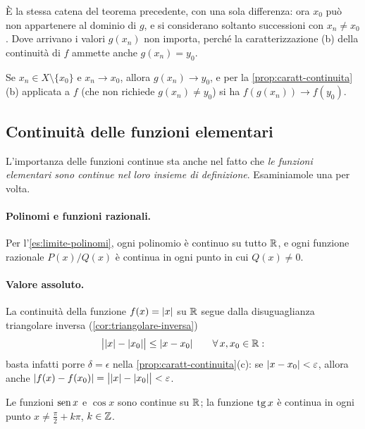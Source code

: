 \begin{strategia}
È la stessa catena del teorema precedente, con una sola differenza: ora $x_{0}$ può
non appartenere al dominio di $g$, e si considerano soltanto successioni con
$x_{n}\neq x_{0}$. Dove arrivano i valori $g(x_{n})$ non importa, perché la
caratterizzazione (b) della continuità di $f$ ammette anche $g(x_{n})=y_{0}$.
\end{strategia}

\begin{dimostrazione}
Se $x_{n}\in X\setminus\{x_{0}\}$ e $x_{n}\to x_{0}$, allora $g(x_{n})\to y_{0}$, e per
la \cref{prop:caratt-continuita}(b) applicata a $f$ (che non richiede $g(x_{n})\neq
y_{0}$) si ha $f(g(x_{n}))\to f(y_{0})$.
\end{dimostrazione}

\subsection{Continuità delle funzioni elementari}

L'importanza delle funzioni continue sta anche nel fatto che \emph{le funzioni
elementari sono continue nel loro insieme di definizione}. Esaminiamole una per volta.

\paragraph{Polinomi e funzioni razionali.} Per l'\cref{es:limite-polinomi}, ogni polinomio
è continuo su tutto $\mathbb{R}$, e ogni funzione razionale $P(x)/Q(x)$ è continua in ogni punto
in cui $Q(x)\neq0$.

\paragraph{Valore assoluto.} La continuità della funzione $f(x)=\lvert x\rvert$ su $\mathbb{R}$ segue
dalla disuguaglianza triangolare inversa (\cref{cor:triangolare-inversa})
\begin{equation}\label{eq:modulo-lipschitz}
  \bigl\lvert\lvert x\rvert-\lvert x_{0}\rvert\bigr\rvert\le\lvert x-x_{0}\rvert \qquad\forall\, x,x_{0}\in\mathbb{R}:
\end{equation}
basta infatti porre $\delta=\epsilon$ nella \cref{prop:caratt-continuita}(c): se
$\lvert x-x_{0}\rvert<\varepsilon$, allora anche $\lvert f(x)-f(x_{0})\rvert=\bigl\lvert\lvert x\rvert-\lvert x_{0}\rvert\bigr\rvert<\varepsilon$.

\begin{proposizione}\label{prop:sen-cos-continue}
Le funzioni $\operatorname{sen} x$ e $\cos x$ sono continue su $\mathbb{R}$; la funzione $\operatorname{tg} x$ è continua
in ogni punto $x\neq\frac\pi2+k\pi$, $k\in\mathbb{Z}$.
\end{proposizione}

